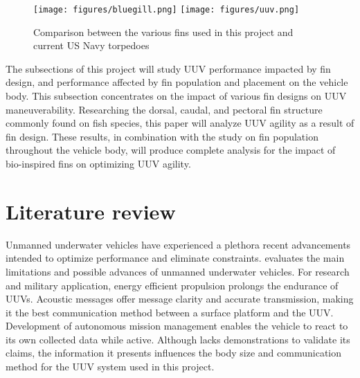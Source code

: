 \documentclass[]{IEEEtran}
\begin{document}
\begin{figure*}
\begin{center}
\texttt{[image: figures/bluegill.png]}
\texttt{[image: figures/uuv.png]}
\end{center}
\caption{Comparison between the various fins used in this project and current US Navy torpedoes \cite{lauder2004morphology}}
\label{fig:2}
\end{figure*}

The subsections of this project will study UUV performance impacted by fin design, and performance affected by fin population and placement on the vehicle body. This subsection concentrates on the impact of various fin designs on UUV maneuverability. Researching the dorsal, caudal, and pectoral fin structure commonly found on fish species, this paper will analyze UUV agility as a result of fin design.  These results, in combination with the study on fin population throughout the vehicle body, will produce complete analysis for the impact of bio-inspired fins on optimizing UUV agility.  

\section{Literature review}
Unmanned underwater vehicles have experienced a plethora recent advancements intended to optimize performance and eliminate constraints.  \cite{hiller2012expanding} evaluates the main limitations and possible advances of unmanned underwater vehicles.  For research and military application, energy efficient propulsion prolongs the endurance of UUVs.  Acoustic messages offer message clarity and accurate transmission, making it the best communication method between a surface platform and the UUV.  Development of autonomous mission management enables the vehicle to react to its own collected data while active.  Although \cite{hiller2012expanding} lacks demonstrations to validate its claims, the information it presents influences the body size and communication method for the UUV system used in this project.  
\end{document}
